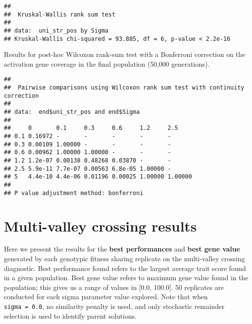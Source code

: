 \documentclass[]{book}
\newenvironment{Shaded}{\begin{snugshade}}{\end{snugshade}}
\newcommand{\DataTypeTok}[1]{\textcolor[rgb]{0.13,0.29,0.53}{#1}}
\newcommand{\KeywordTok}[1]{\textcolor[rgb]{0.13,0.29,0.53}{\textbf{#1}}}
\newcommand{\NormalTok}[1]{#1}
\newcommand{\OperatorTok}[1]{\textcolor[rgb]{0.81,0.36,0.00}{\textbf{#1}}}
\newcommand{\OtherTok}[1]{\textcolor[rgb]{0.56,0.35,0.01}{#1}}
\newcommand{\StringTok}[1]{\textcolor[rgb]{0.31,0.60,0.02}{#1}}
\begin{document}
\begin{verbatim}
## 
##  Kruskal-Wallis rank sum test
## 
## data:  uni_str_pos by Sigma
## Kruskal-Wallis chi-squared = 93.885, df = 6, p-value < 2.2e-16
\end{verbatim}

Results for post-hoc Wilcoxon rank-sum test with a Bonferroni correction on the activation gene coverage in the final population (50,000 generations).

\begin{Shaded}
\end{Shaded}

\begin{verbatim}
## 
##  Pairwise comparisons using Wilcoxon rank sum test with continuity correction 
## 
## data:  end$uni_str_pos and end$Sigma 
## 
##     0       0.1     0.3     0.6     1.2     2.5    
## 0.1 0.16972 -       -       -       -       -      
## 0.3 0.00109 1.00000 -       -       -       -      
## 0.6 0.00962 1.00000 1.00000 -       -       -      
## 1.2 1.2e-07 0.00138 0.48268 0.03870 -       -      
## 2.5 5.9e-11 7.7e-07 0.00563 6.8e-05 1.00000 -      
## 5   4.4e-10 4.4e-06 0.01196 0.00025 1.00000 1.00000
## 
## P value adjustment method: bonferroni
\end{verbatim}

\hypertarget{multi-valley-crossing-results-3}{%
\section{Multi-valley crossing results}\label{multi-valley-crossing-results-3}}

Here we present the results for the \textbf{best performances} and \textbf{best gene value} generated by each genotypic fitness sharing replicate on the multi-valley crossing diagnostic.
Best performance found refers to the largest average trait score found in a given population.
Best gene value refers to maximum gene value found in the population; this gives us a range of values in {[}0.0, 100.0{]}.
50 replicates are conducted for each sigma parameter value explored.
Note that when \texttt{sigma\ =\ 0.0}, no similarity penalty is used, and only stochastic remainder selection is used to identify parent solutions.
\end{document}
